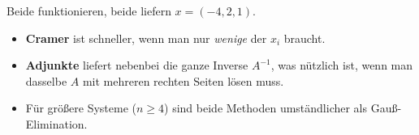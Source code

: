 \documentclass[a4paper,12pt]{article}
\begin{document}
Beide funktionieren, beide liefern $x = (-4, 2, 1)$.
\begin{itemize}[nosep, leftmargin=*]
\item \textbf{Cramer} ist schneller, wenn man nur \emph{wenige} der $x_i$ braucht.
\item \textbf{Adjunkte} liefert nebenbei die ganze Inverse $A^{-1}$, was n\"utzlich ist, wenn man dasselbe $A$ mit mehreren rechten Seiten l\"osen muss.
\item F\"ur gr\"o\ss ere Systeme ($n \geq 4$) sind beide Methoden umst\"andlicher als Gau\ss-Elimination.
\end{itemize}
\end{document}
